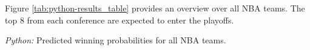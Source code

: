 \documentclass[11pt, a4paper, leqno]{article}
\begin{document}
Figure \ref{tab:python-results_table} provides an overview over all NBA teams. The top 8 from each conference are expected to enter the playoffs.

\begin{table}[H]
    \caption{\label{tab:python-results_table}\emph{Python:} Predicted winning probabilities for all NBA teams.}
    
\end{table}



\printbibliography
{}
\end{document}
